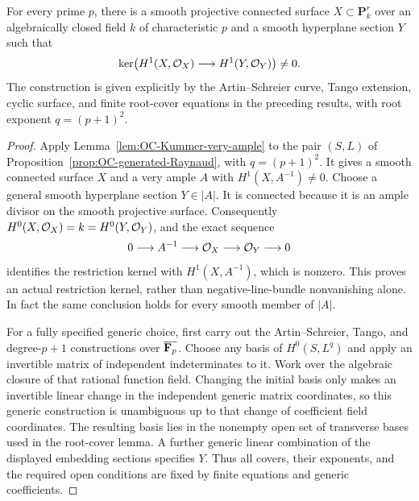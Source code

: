 \begin{theorem}
\label{thm:OC-surface-coherent-counterexample}
For every prime $p$, there is a smooth projective connected surface
$X\subset\mathbf P^r_k$ over an algebraically closed field $k$ of characteristic $p$ and a smooth hyperplane section $Y$ such that
\[
             \ker\bigl(H^1(X,\mathcal O_X)\longrightarrow H^1(Y,\mathcal O_Y)\bigr)\ne0.
\]
The construction is given explicitly by the Artin--Schreier curve, Tango extension, cyclic surface, and finite root-cover equations in the preceding results, with root exponent $q=(p+1)^2$.
\end{theorem}
\begin{proof}
Apply Lemma~\ref{lem:OC-Kummer-very-ample} to the pair $(S,L)$ of
Proposition~\ref{prop:OC-generated-Raynaud}, with $q=(p+1)^2$.  It gives a smooth connected surface $X$ and a very ample $A$ with
$H^1(X,A^{-1})\ne0$.
Choose a general smooth hyperplane section $Y\in|A|$.  It is connected because it is an ample divisor on the smooth projective surface.  Consequently
$H^0(X,\mathcal O_X)=k=H^0(Y,\mathcal O_Y)$, and the exact sequence
\[
       0\longrightarrow A^{-1}\longrightarrow\mathcal O_X
                       \longrightarrow\mathcal O_Y\longrightarrow0
\]
identifies the restriction kernel with $H^1(X,A^{-1})$, which is nonzero.  This proves an actual restriction kernel, rather than negative-line-bundle nonvanishing alone.  In fact the same conclusion holds for every smooth member of $|A|$.

For a fully specified generic choice, first carry out the Artin--Schreier, Tango, and degree-$p+1$ constructions over $\overline{\mathbf F_p}$.  Choose any basis of $H^0(S,L^q)$ and apply an invertible matrix of independent indeterminates to it.  Work over the algebraic closure of that rational function field.  Changing the initial basis only makes an invertible linear change in the independent generic matrix coordinates, so this generic construction is unambiguous up to that change of coefficient field coordinates.  The resulting basis lies in the nonempty open set of transverse bases used in the root-cover lemma.  A further generic linear combination of the displayed embedding sections specifies $Y$.  Thus all covers, their exponents, and the required open conditions are fixed by finite equations and generic coefficients.
\end{proof}

